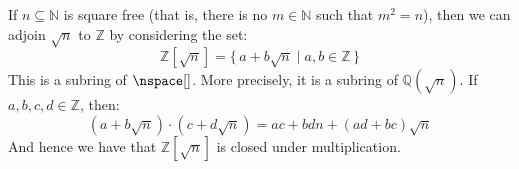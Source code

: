     \begin{example}
        If $n\subseteq\mathbb{N}$ is square free (that is, there is no
        $m\in\mathbb{N}$ such that $m^{2}=n$), then we can adjoin
        $\sqrt{n}$ to $\mathbb{Z}$ by considering the set:
        \begin{equation}
            \mathbb{Z}[\sqrt{n}]=\{\,a+b\sqrt{n}\;|\;a,b\in\mathbb{Z}\,\}
        \end{equation}
        This is a subring of $\nspace[]$. More precisely, it is a subring of
        $\mathbb{Q}(\sqrt{n})$. If $a,b,c,d\in\mathbb{Z}$, then:
        \begin{equation}
            (a+b\sqrt{n})\cdot(c+d\sqrt{n})=ac+bdn+(ad+bc)\sqrt{n}
        \end{equation}
        And hence we have that $\mathbb{Z}[\sqrt{n}]$ is closed under
        multiplication.
    \end{example}
